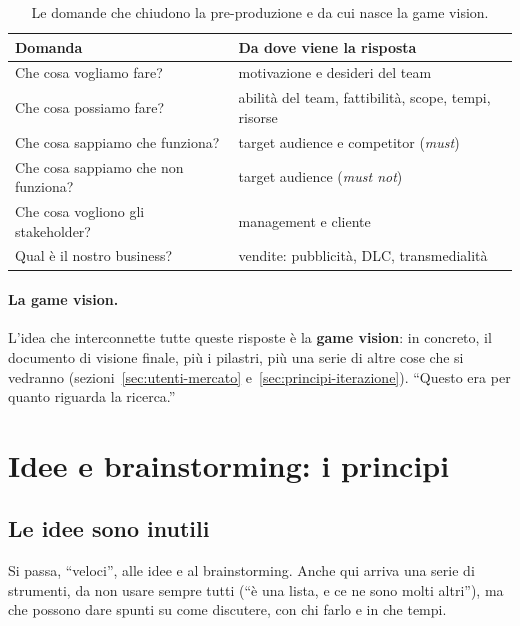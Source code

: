 \begin{table}[htbp]
  \centering
  \caption{Le domande che chiudono la pre-produzione e da cui nasce la game
  vision.}
  \label{tab:domande-visione}
  \begin{tabular}{@{}p{}p{}@{}}
    \toprule
    \textbf{Domanda} & \textbf{Da dove viene la risposta} \\
    \midrule
    Che cosa vogliamo fare? & motivazione e desideri del team \\
    Che cosa possiamo fare? & abilità del team, fattibilità, scope, tempi, risorse \\
    Che cosa sappiamo che funziona? & target audience e competitor (\emph{must}) \\
    Che cosa sappiamo che non funziona? & target audience (\emph{must not}) \\
    Che cosa vogliono gli stakeholder? & management e cliente \\
    Qual è il nostro business? & vendite: pubblicità, DLC, transmedialità \\
    \bottomrule
  \end{tabular}
\end{table}

\paragraph{La game vision.} L'idea che interconnette tutte queste risposte è la
\textbf{game vision}: in concreto, il documento di visione finale, più i
pilastri, più una serie di altre cose che si vedranno
(sezioni~\ref{sec:utenti-mercato} e~\ref{sec:principi-iterazione}). ``Questo
era per quanto riguarda la ricerca.''

\section{Idee e brainstorming: i principi}
\label{sec:principi-brainstorming}

\subsection{Le idee sono inutili}

Si passa, ``veloci'', alle idee e al brainstorming. Anche qui arriva una serie
di strumenti, da non usare sempre tutti (``è una lista, e ce ne sono molti
altri''), ma che possono dare spunti su come discutere, con chi farlo e in che
tempi.


